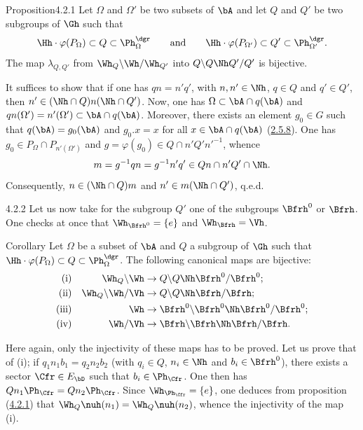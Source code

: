 \documentclass[12pt,a4paper,oneside,english]{smfart}
\makeatletter
\newcommand{\btanchor}[1]{\leavevmode\Hy@raisedlink{\hypertarget{bt:#1}{}}}
\newcommand{\btref}[1]{\hyperlink{bt:#1}{#1}}
\theoremstyle{definition}
\theoremstyle{bt}
\makeatother
\begin{document}
\begin{state}{Proposition}{4.2.1}\btanchor{4.2.1}
Let $\Omega$ and $\Omega'$ be two subsets of $\bA$ and let $Q$ and $Q'$ be
two subgroups of $\Gh$ such that
\[
\Hh\cdot\varphi(P_{\Omega}) \subset Q \subset \Ph^{\dgr}_{\Omega}
\qquad\text{and}\qquad
\Hh\cdot\varphi(P_{\Omega'}) \subset Q' \subset \Ph^{\dgr}_{\Omega'} .
\]
The map $\lambda_{Q,Q'}$ from $\Wh_{Q}\backslash\Wh/\Wh_{Q'}$ into
$Q\backslash Q\Nh Q'/Q'$ is bijective.
\end{state}

It suffices to show that if one has $qn = n'q'$, with $n, n'\in\Nh$,
$q\in Q$ and $q'\in Q'$, then $n' \in (\Nh\cap Q)n(\Nh\cap Q')$. Now, one has
$\Omega \subset \bA\cap q(\bA)$ and
$qn(\Omega') = n'(\Omega')\subset \bA\cap q(\bA)$. Moreover, there exists an
element $g_0 \in G$ such that $q(\bA) = g_0(\bA)$ and $g_0.x = x$ for all
$x \in \bA\cap q(\bA)$ (\btref{2.5.8}). One has
$g_0 \in P_{\Omega}\cap P_{n'(\Omega')}$ and
$g = \varphi(g_0)\in Q\cap n'Q'n'^{-1}$, whence
\[
m = g^{-1}qn = g^{-1}n'q' \in Qn \cap n'Q' \cap \Nh .
\]
Consequently, $n \in (\Nh\cap Q)m$ and $n' \in m(\Nh\cap Q')$, q.e.d.

\num{4.2.2}\btanchor{4.2.2}
Let us now take for the subgroup $Q'$ one of the subgroups $\Bfrh^{0}$ or
$\Bfrh$. One checks at once that $\Wh_{\Bfrh^{0}} = \{e\}$ and
$\Wh_{\Bfrh} = \Vh$.

\begin{states}{Corollary}
Let $\Omega$ be a subset of $\bA$ and $Q$ a subgroup of $\Gh$ such that
$\Hh\cdot\varphi(P_{\Omega}) \subset Q \subset \Ph^{\dgr}_{\Omega}$. The
following canonical maps are bijective:
\begin{align*}
\text{(i)} && \Wh_{Q}\backslash\Wh &\to Q\backslash Q\Nh\Bfrh^{0}/\Bfrh^{0};\\
\text{(ii)} && \Wh_{Q}\backslash\Wh/\Vh &\to Q\backslash Q\Nh\Bfrh/\Bfrh;\\
\text{(iii)} && \Wh &\to \Bfrh^{0}\backslash\Bfrh^{0}\Nh\Bfrh^{0}/\Bfrh^{0};\\
\text{(iv)} && \Wh/\Vh &\to \Bfrh\backslash\Bfrh\Nh\Bfrh/\Bfrh .
\end{align*}
\end{states}

Here again, only the injectivity of these maps has to be proved. Let us prove
that of (i); if $q_1n_1b_1 = q_2n_2b_2$ (with $q_i\in Q$, $n_i\in\Nh$ and
$b_i\in\Bfrh^{0}$), there exists a sector $\Cfr\in E_{\bD}$ such that
$b_i \in \Ph_{\Cfr}$. One then has $Qn_1\Ph_{\Cfr} = Qn_2\Ph_{\Cfr}$. Since
$\Wh_{\Ph_{\Cfr}} = \{e\}$, one deduces from proposition (\btref{4.2.1}) that
$\Wh_{Q}\nuh(n_1) = \Wh_{Q}\nuh(n_2)$, whence the injectivity of the map (i).
\end{document}
